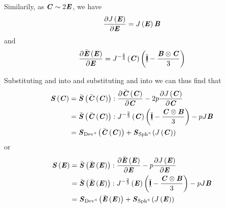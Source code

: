 Similarily, as $\boldsymbol{\mathit{C}}\sim 2\boldsymbol{\mathit{E}}$, we have
\begin{equation}
  \delby{\fnof{J}{\tensortwo{E}}}{\tensortwo{E}}=\fnof{J}{\tensortwo{E}}\tensortwo{B}
  \label{eqn:DelJacobianDelE}
\end{equation}
and
\begin{equation}
  \delby{\fnof{\bar{\tensortwo{E}}}{\tensortwo{E}}}{\tensortwo{E}}=
  \fnof{J^{-\frac{2}{3}}}{\tensortwo{C}}\pbrac{\symidentitytensorfour-\dfrac{\tensorprod{\tensortwo{B}}{\tensortwo{C}}}{3}}
  \label{eqn:DelEBarDelE}
\end{equation}

Substituting  and  into
 and substituting  and
 into  we can thus find that
\begin{equation}
  \begin{split}
    \fnof{\tensor{S}}{\tensor{C}}
    &=\doubledotprod{\fnof{\bar{\tensor{S}}}{\fnof{\bar{\tensortwo{C}}}{\tensortwo{C}}}}{\delby{\fnof{\bar{\tensor{C}}}{\tensortwo{C}}}{\tensor{C}}}-2p\delby{\fnof{J}{\tensortwo{C}}}{\tensor{C}}\\
    &=\doubledotprod{\fnof{\bar{\tensor{S}}}{\fnof{\bar{\tensortwo{C}}}{\tensortwo{C}}}}{\fnof{J^{-\frac{2}{3}}}{\tensortwo{C}}\pbrac{\symidentitytensorfour-\dfrac{\tensorprod{\tensor{C}}{\tensor{B}}}{3}}}-pJ\tensor{B}\\
    &=\fnof{\tensor{S}_{\pullback{\Devop}{}}}{\fnof{\bar{\tensortwo{C}}}{\tensortwo{C}}}
    +\fnof{\tensor{S}_{\pullback{\Sphop}{}}}{\fnof{J}{\tensortwo{C}}}
  \end{split}
  \label{eqn:DecomposedSecondPKinC}
\end{equation}
or
\begin{equation}
  \begin{split}
    \fnof{\tensor{S}}{\tensor{E}}
    &=\doubledotprod{\fnof{\bar{\tensor{S}}}{\fnof{\bar{\tensortwo{E}}}{\tensortwo{E}}}}{\delby{\fnof{\bar{\tensor{E}}}{\tensortwo{E}}}{\tensor{E}}}-p\delby{\fnof{J}{\tensortwo{E}}}{\tensor{E}}\\
    &=\doubledotprod{\fnof{\bar{\tensor{S}}}{\fnof{\bar{\tensortwo{E}}}{\tensortwo{E}}}}{\fnof{J^{-\frac{2}{3}}}{\tensortwo{E}}\pbrac{\symidentitytensorfour-\dfrac{\tensorprod{\tensor{C}}{\tensor{B}}}{3}}}-pJ\tensor{B}\\
    &=\fnof{\tensor{S}_{\pullback{\Devop}{}}}{\fnof{\bar{\tensortwo{E}}}{\tensortwo{E}}}
    +\fnof{\tensor{S}_{\pullback{\Sphop}{}}}{\fnof{J}{\tensortwo{E}}}
  \end{split}
  \label{eqn:DecomposedSecondPKinE}
\end{equation}


